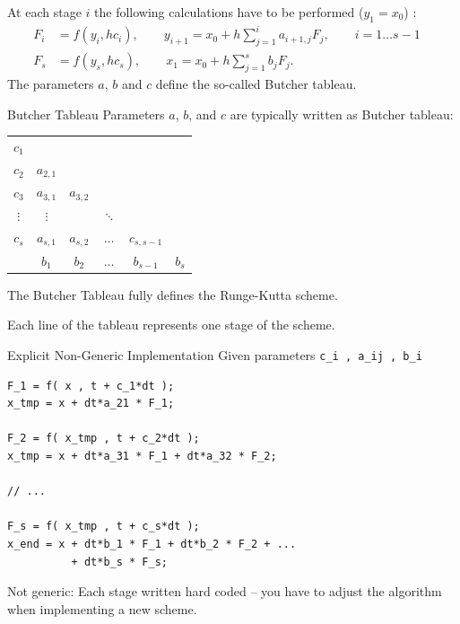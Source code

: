 \documentclass{beamer}
\begin{document}
\begin{frame}
 At each stage $i$ the following calculations have to be performed ($y_1 = x_0$) :
\begin{align*} \label{eqn:rk_scheme}
 F_i &= f( y_{i} , h c_i ), \qquad y_{i+1} = x_0 + h\sum_{j=1}^{i} a_{i+1,j} F_j, \qquad i=1\dots s-1\quad 
\\
 F_s &= f(y_{s} , h c_s ) , \qquad x_1 = x_0 + h\sum_{j=1}^{s} b_{j} F_j.
\end{align*}
The parameters $a$, $b$ and $c$ define the so-called Butcher tableau.

\end{frame}


\begin{frame}{Butcher Tableau}
Parameters $a$, $b$, and $c$ are typically written as Butcher tableau:

\begin{center}
 \begin{tabular}{c|ccccc}
   $c_1$ &  & & & & \\
   $c_2$ & $a_{2,1}$ & & & & \\
   $c_3$ & $a_{3,1}$ & $a_{3,2}$ & & & \\
   $\vdots$ & $\vdots$ &  & $\ddots$ & & \\
   $c_s$ & $a_{s,1}$ & $a_{s,2}$ & $\dots$ & $c_{s,s-1}$ & \\
  \hline 
    & $b_1$ & $b_2$ & $\dots$ & $b_{s-1}$ & $b_s$ \\
 \end{tabular}
\end{center}
 
The Butcher Tableau fully defines the Runge-Kutta scheme.

Each line of the tableau represents one stage of the scheme.
\end{frame}

\begin{frame}[fragile]{Explicit Non-Generic Implementation}
Given parameters \lstinline+c_i , a_ij , b_i+ 
\begin{lstlisting}
F_1 = f( x , t + c_1*dt );
x_tmp = x + dt*a_21 * F_1;

F_2 = f( x_tmp , t + c_2*dt );
x_tmp = x + dt*a_31 * F_1 + dt*a_32 * F_2;

// ...

F_s = f( x_tmp , t + c_s*dt );
x_end = x + dt*b_1 * F_1 + dt*b_2 * F_2 + ... 
          + dt*b_s * F_s; 
\end{lstlisting}

Not generic: Each stage written hard coded -- you have to adjust the algorithm when implementing a new scheme.
\end{frame}
\end{document}
